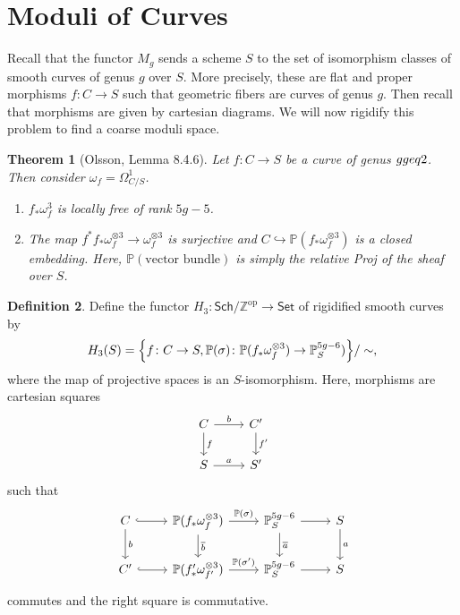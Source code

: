 \documentclass[leqno, openany]{memoir}
\newtheorem{thm}{Theorem}[section]
\theoremstyle{definition}
\newtheorem{defn}[thm]{Definition}
\theoremstyle{remark}
\theoremstyle{plain}
\theoremstyle{definition}
\theoremstyle{remark}
\newcommand{\Z}{\mathbb{Z}}
\renewcommand{\P}{\mathbb{P}}
\newcommand{\mr}[1]{\mathrm{#1}}
\newcommand{\ms}[1]{\mathsf{#1}}
\newcommand{\ol}[1]{\overline{#1}}
\begin{document}
\section{Moduli of Curves}%
\label{sec:moduli_of_curves}

Recall that the functor $M_g$ sends a scheme $S$ to the set of isomorphism classes of smooth curves of genus $g$ over $S$. More precisely, these are flat and proper morphisms $f \colon C \to S$ such that geometric fibers are curves of genus $g$. Then recall that morphisms are given by cartesian diagrams. We will now rigidify this problem to find a coarse moduli space. 

\begin{thm}[Olsson, Lemma 8.4.6]
    Let $f \colon C \to S$ be a curve of genus $g \\geq 2$. Then consider $\omega_f = \Omega^1_{C/S}$. 
    \begin{enumerate}
        \item $f_* \omega_f^3$ is locally free of rank $5g-5$.
        \item The map $f^* f_* \omega_f^{\otimes 3} \to \omega_f^{\otimes 3}$ is surjective and $C \hookrightarrow \P(f_* \omega_f^{\otimes 3})$ is a closed embedding. Here, $\P(\text{vector bundle})$ is simply the relative Proj of the sheaf over $S$.
    \end{enumerate}
\end{thm}

\begin{defn}
    Define the functor $H_3 \colon \ms{Sch}/\Z^{\mr{op}} \to \ms{Set}$ of rigidified smooth curves by
    \[ H_3(S) = \qty{ f \colon C \to S, \P(\sigma) \colon \P(f_* \omega_f^{\otimes 3}) \to \P_S^{5g-6} ) } / \sim, \]
    where the map of projective spaces is an $S$-isomorphism. Here, morphisms are cartesian squares
    \begin{equation*}
    \begin{tikzcd}
        C \arrow{r}{b} \arrow{d}{f} & C' \arrow{d}{f'} \\
        S \arrow{r}{a} & S'
    \end{tikzcd}
    \end{equation*}
    such that
    \begin{equation}
        \label{eqn:largerect}
    \begin{tikzcd}
        C \arrow{d}{b} \arrow[hookrightarrow]{r} & \P(f_* \omega_f^{\otimes 3}) \arrow{r}{\P(\sigma)} \arrow{d}{\ol{b}} & \P_S^{5g-6} \arrow{r} \arrow{d}{\ol{a}} & S \arrow{d}{a} \\
        C' \arrow[hookrightarrow]{r} & \P(f'_* \omega_{f'}^{\otimes 3}) \arrow{r}{\P(\sigma')} & \P_S^{5g-6} \arrow{r} & S
    \end{tikzcd}
    \end{equation}
    commutes and the right square is commutative.
\end{defn}
\end{document}
